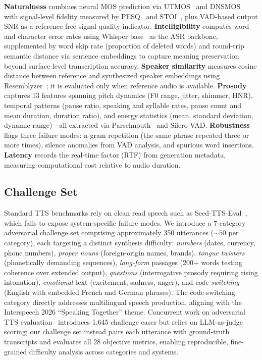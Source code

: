 \textbf{Naturalness} combines neural MOS prediction via
UTMOS~\cite{saeki2022utmos} and DNSMOS~\cite{reddy2021dnsmos} with
signal-level fidelity measured by PESQ~\cite{itu2001pesq} and
STOI~\cite{taal2011stoi}, plus VAD-based output SNR as a reference-free
signal quality indicator.
\textbf{Intelligibility} computes word and character error rates using
Whisper base~\cite{radford2023whisper} as the ASR backbone, supplemented by
word skip rate (proportion of deleted words) and round-trip semantic
distance via sentence embeddings to capture meaning preservation beyond
surface-level transcription accuracy.
\textbf{Speaker similarity} measures cosine distance between reference and
synthesized speaker embeddings using
Resemblyzer~\cite{jemine2019resemblyzer}; it is evaluated only when
reference audio is available.
\textbf{Prosody} captures 13 features spanning pitch dynamics (F0 range,
jitter, shimmer, HNR), temporal patterns (pause ratio, speaking and
syllable rates, pause count and mean duration, duration ratio), and energy
statistics (mean, standard deviation, dynamic range)---all extracted via
Parselmouth~\cite{jadoul2018parselmouth} and Silero VAD.
\textbf{Robustness} flags three failure modes: n-gram repetition (the same
phrase repeated three or more times), silence anomalies from VAD analysis,
and spurious word insertions.
\textbf{Latency} records the real-time factor (RTF) from generation
metadata, measuring computational cost relative to audio duration.

\subsection{Challenge Set}

Standard TTS benchmarks rely on clean read speech such as
Seed-TTS-Eval~\cite{anastassiou2024seedtts}, which fails to expose
system-specific failure modes. We introduce a 7-category adversarial
challenge set comprising approximately 350 utterances (${\sim}50$ per
category), each targeting a distinct synthesis difficulty:
\textit{numbers} (dates, currency, phone numbers), \textit{proper nouns}
(foreign-origin names, brands), \textit{tongue twisters} (phonetically
demanding sequences), \textit{long-form} passages (200+ words testing
coherence over extended output), \textit{questions} (interrogative prosody
requiring rising intonation), \textit{emotional} text (excitement, sadness,
anger), and \textit{code-switching} (English with embedded French and
German phrases). The code-switching category directly addresses multilingual
speech production, aligning with the Interspeech 2026 ``Speaking Together''
theme. Concurrent work on adversarial TTS
evaluation~\cite{manku2025emergentttseval} introduces 1,645 challenge cases
but relies on LLM-as-judge scoring; our challenge set instead pairs each
utterance with ground-truth transcripts and evaluates all 28 objective
metrics, enabling reproducible, fine-grained difficulty analysis across
categories and systems.

